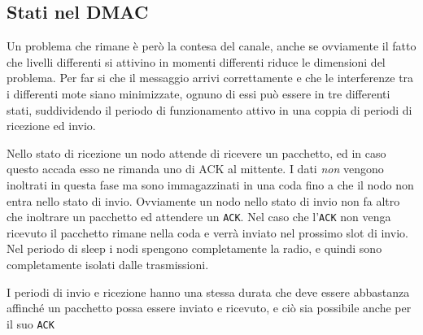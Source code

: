 \documentclass[pdftex,12pt,a4paper,italian]{article}
\begin{document}
\subsection{Stati nel DMAC}
Un problema che rimane è però la contesa del canale, anche se ovviamente il fatto che livelli 
differenti si attivino in momenti differenti riduce le dimensioni del problema.
Per far si che il messaggio arrivi correttamente e che le interferenze tra i differenti 
mote siano minimizzate, ognuno di essi può essere in tre differenti stati, suddividendo il 
periodo di funzionamento attivo in una coppia di periodi di ricezione ed invio. 

Nello stato di ricezione un nodo attende di ricevere un pacchetto, ed in caso questo accada 
esso ne rimanda uno di ACK al mittente. I dati \emph{non} vengono inoltrati in questa fase ma 
sono immagazzinati in una coda fino a che il nodo non entra nello stato di invio.
Ovviamente un nodo nello stato di invio non fa altro che inoltrare un pacchetto ed attendere un 
\texttt{ACK}. Nel caso che l'\texttt{ACK}  non venga ricevuto il pacchetto rimane nella coda e 
verrà inviato nel prossimo slot di invio. 
Nel periodo di sleep i nodi spengono completamente la radio, e quindi sono completamente isolati dalle trasmissioni. 

I periodi di invio e ricezione hanno una stessa durata \mu che deve essere abbastanza affinché 
un pacchetto possa essere inviato e ricevuto, e ciò sia possibile anche per il suo \texttt{ACK} 
\end{document}
